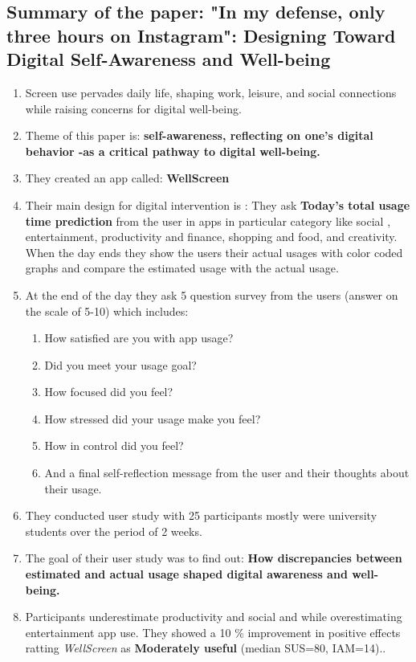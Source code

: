 \documentclass[12pt]{article}
\begin{document}
\subsection{Summary of the paper: "In my defense, only three hours on Instagram": Designing
Toward Digital Self-Awareness and Well-being} \cite{karthik2026}
\begin{enumerate}
    \item Screen use pervades daily life, shaping work, leisure, and social connections while raising concerns for digital well-being.
    \item Theme of this paper is: \textbf{self-awareness, reflecting on one's digital behavior -as a critical pathway to digital well-being.}
    \item They created an app called: \textbf{WellScreen}
    \item Their main design for digital intervention is : They ask \textbf{Today's total usage time prediction} from the user in apps in particular category like social , entertainment, productivity and finance, shopping and food, and creativity. When the day ends they show the users their actual usages with color coded graphs and compare the estimated usage with the actual usage.
    \item At the end of the day they ask 5 question survey from the users (answer on the scale of 5-10) which includes: 
    \begin{enumerate}
        \item How satisfied are you with app usage?
        \item Did you meet your usage goal?
        \item How focused did you feel?
        \item How stressed did your usage make you feel?
        \item How in control did you feel?
        \item And a final self-reflection message from the user and their thoughts about their usage.
    \end{enumerate}
    \item They conducted user study with 25 participants mostly were university students over the period of 2 weeks.
    \item The goal of their user study was to find out: \textbf{How discrepancies between estimated and actual usage shaped digital awareness and well-being.}
    \item Participants  underestimate productivity and social and while overestimating entertainment app use. They showed a 10 \% improvement in positive effects ratting \textit{WellScreen} as \textbf{Moderately useful} (median SUS=80, IAM=14)..

\end{enumerate}
\end{document}
